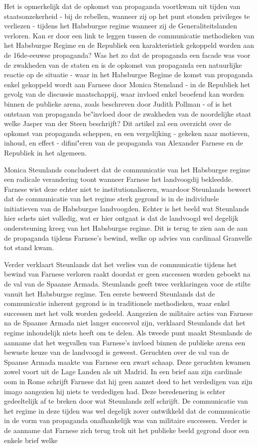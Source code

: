\documentclass[11pt]{amsart}
\begin{document}
Het is opmerkelijk dat de opkomst van propaganda voortkwam uit tijden van staatsonzekerheid - bij de rebellen, wanneer
zij op het punt stonden privileges te verliezen - tijdens het Habsburgse regime wanneer zij de Generaliteitslanden
verloren. Kan er door een link te leggen tussen de communicatie methodieken van het Habsburgse Regime en de Republiek
een karakteristiek gekoppeld worden aan de 16de-eeuwse propaganda? Was het zo dat de propaganda een facade was voor de
zwakheden van de staten en is de opkomst van propaganda een natuurlijke reactie op de situatie - waar in het Habsburgse
Regime de komst van propaganda enkel gekoppeld wordt aan Farnese door Monica Stensland - in de Republiek het gevolg van
de discussie maatschappij, waar invloed enkel beoefend kan worden binnen de publieke arena, zoals beschreven door
Judith Pollman - of is het ontstaan van propaganda be"invloed door de zwakheden van de noordelijke staat welke Jasper
van der Steen beschrijft? Dit artikel zal een overzicht over de opkomst van propaganda scheppen, en een vergelijking -
gekeken naar motieven, inhoud, en effect - difini"eren van de propaganda van Alexander Farnese en de Republiek in het
algemeen.

Monica Steunlands concludeert dat de communicatie van het Habsburgse regime een radicale verandering toont wanneer
Farnese het landvoogdij bekleedde. Farnese wist deze echter niet te institutionaliseren, waardoor Steunlands beweert
dat de communicatie van het regime sterk gegrond is in de individuele initiatieven van de Habsburgse landvoogden.
Echter is het beeld wat Steunlands hier schets niet volledig, wat er hier ontgaat is dat de landvoogd wel degelijk ondersteuning kreeg van het Habsburgse regime. 
Dit is terug te zien aan de aan de propaganda tijdens Farnese's bewind, welke op advies van cardinaal Granvelle tot stand kwam. 

Verder verklaart
Steunlands dat het verlies van de communicatie tijdens het bewind van Farnese verloren raakt doordat er geen successen
worden geboekt na de val van de Spaanse Armada. Steunlands geeft twee verklaringen voor de stilte vanuit het Habsburgse
regime. Ten eerste beweerd Steunlands dat de communicatie inherent gegrond is in
traditionele methodieken, waar enkel successen met het volk worden gedeeld. Aangezien de militaire acties van Farnese
na de Spaanse Armada niet langer succesvol zijn, verklaard Steunlands dat het regime inhoudelijk niets heeft om te delen. 
Als tweede punt maakt Steunlands de aanname dat het wegvallen van Farnese's invloed binnen de publieke
arena een bewuste keuze van de landvoogd is geweest. Geruchten over de val van de Spaanse Armada maakte van Farnese een zwart schaap.
Deze geruchten kwamen zowel voort uit de Lage Landen als uit Madrid. In een brief aan zijn cardinale oom in Rome
schrijft Farnese dat hij geen aanzet deed to het verdedigen van zijn imago aangezien hij niets te verdedigen had.
Deze beredenering is echter gedeeltelijk af te breken door wat Steunlands zelf schrijft. De communicatie van het regime in deze tijden
was wel degelijk zover ontwikkeld dat de communicatie in de vorm van propaganda onafhankelijk was van militaire successen. 
Verder is de aanname dat Farnese zich terug trok uit het publieke beeld gegrond door een enkele brief welke 
\end{document}
